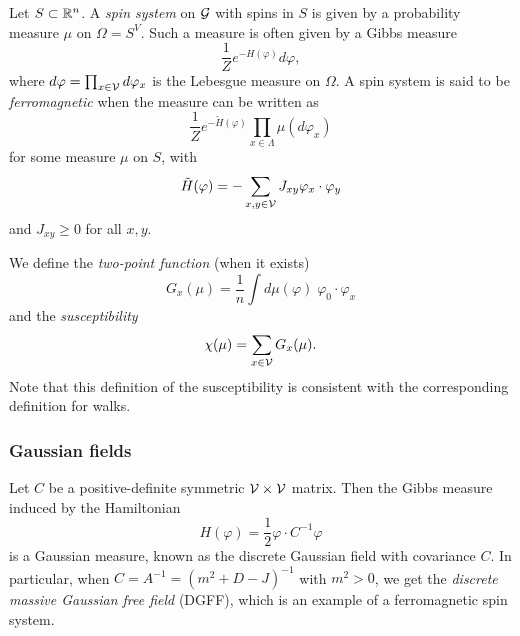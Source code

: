 Let $S \subset {\mathbb R}^n$. A \emph{spin system} on $\mathcal{G}$ with spins in $S$ is given
by a probability measure $\mu$ on $\Omega = S^V$. Such a measure is often given by a
Gibbs measure
\begin{equation}
\frac{1}{Z} e^{-H(\varphi)} d\varphi,
\end{equation}
where $d\varphi = \prod_{x\in\mathcal{V}} d\varphi_x$ is the Lebesgue measure on
$\Omega$. A spin system is said to be \emph{ferromagnetic} when the measure can
be written as
\begin{equation}
\frac{1}{Z} e^{-\tilde H(\varphi)} \prod_{x\in\Lambda} \mu(d\varphi_x)
\end{equation}
for some measure $\mu$ on $S$, with
\begin{equation}
\tilde H(\varphi) = -\sum_{x, y \in \mathcal{V}} J_{xy} \varphi_x \cdot \varphi_y
\end{equation}
and $J_{xy} \ge 0$ for all $x, y$.


We define the \emph{two-point function} (when it exists)
\begin{equation}
G_x(\mu) = \frac{1}{n} \int d\mu(\varphi) \; \varphi_0 \cdot \varphi_x
\end{equation}
and the \emph{susceptibility}
\begin{equation}
\chi(\mu) = \sum_{x\in\mathcal{V}} G_x(\mu).
\end{equation}
Note that this definition of the susceptibility is consistent with the corresponding
definition for walks.


\subsubsection{Gaussian fields}

Let $C$ be a positive-definite symmetric $\mathcal{V}\times\mathcal{V}$ matrix.
Then the Gibbs measure induced by the Hamiltonian
\begin{equation}
H(\varphi) = \frac{1}{2} \varphi \cdot C^{-1} \varphi
\end{equation}
is a Gaussian measure, known as the discrete Gaussian field with covariance $C$.
In particular, when $C = A^{-1} = (m^2 + D - J)^{-1}$ with $m^2 > 0$, we get the
\emph{discrete massive Gaussian free field} (DGFF), which is an example of a ferromagnetic
spin system.


